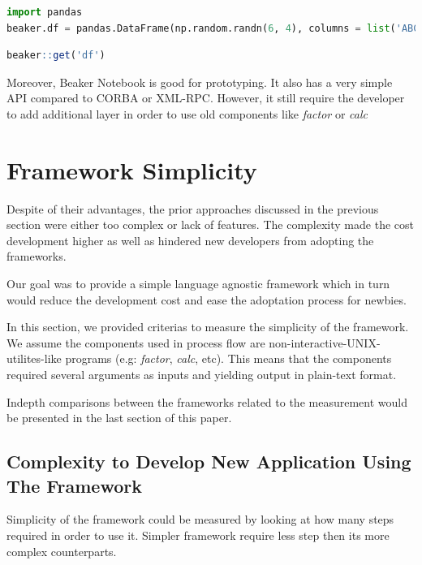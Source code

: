 \documentclass[conference]{IEEEtran}
\begin{document}
\begin{lstlisting}[caption=Beaker Python Cell Example, label=beakerPython, language=python, basicstyle=\small, breaklines=true]
import pandas
beaker.df = pandas.DataFrame(np.random.randn(6, 4), columns = list('ABCD'))
\end{lstlisting}

\begin{lstlisting}[caption=Beaker R Cell Example, label=beakerR, language=R, basicstyle=\small, breaklines=true]
beaker::get('df')
\end{lstlisting}

Moreover, Beaker Notebook is good for prototyping. It also has a very simple API compared to
CORBA or XML-RPC. However, it still require the developer to add additional layer
in order to use old components like {\it factor} or {\it calc}


\section{Framework Simplicity}

Despite of their advantages, the prior approaches discussed in the previous section were
either too complex or lack of features. The complexity made the cost development higher
as well as hindered new developers from adopting the frameworks.

Our goal was to provide a simple language agnostic framework which in turn would reduce
the development cost and ease the adoptation process for newbies.

In this section, we provided criterias to measure the simplicity of the framework.
We assume the components used in process flow are non-interactive-UNIX-utilites-like
programs (e.g: {\it factor}, {\it calc}, etc). 
This means that the components required several arguments as inputs and yielding output
in plain-text format.

Indepth comparisons between the frameworks related to the measurement would be presented 
in the last section of this paper.


\subsection{Complexity to Develop New Application Using The Framework}

Simplicity of the framework could be measured by looking at how many steps required
in order to use it. Simpler framework require less step then its more complex counterparts.
\end{document}
